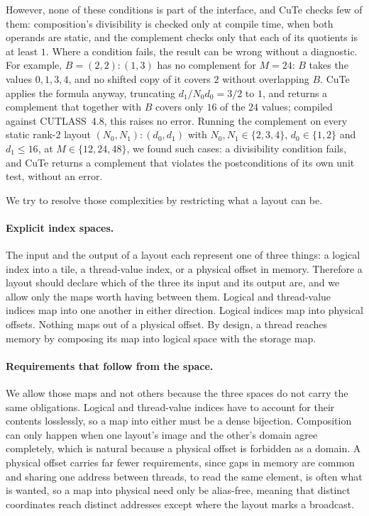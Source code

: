 However, none of these conditions is part of the interface, and CuTe checks
few of them: composition's divisibility is checked only at compile time, when
both operands are static, and the complement checks only that each of its
quotients is at least $1$. Where a condition fails, the result can be wrong
without a diagnostic. For example, $B = (2,2){:}(1,3)$ has no complement for
$M = 24$: $B$ takes the values $0,1,3,4$, and no shifted copy of it covers $2$
without overlapping $B$. CuTe applies the formula anyway, truncating
$d_1/N_0d_0 = 3/2$ to $1$, and returns a complement that together with $B$
covers only $16$ of the $24$ values; compiled against CUTLASS~4.8, this raises
no error. Running the complement on every static rank-2 layout
$(N_0,N_1){:}(d_0,d_1)$ with $N_0, N_1 \in \{2,3,4\}$, $d_0 \in \{1,2\}$ and
$d_1 \le 16$, at $M \in \{12,24,48\}$, we found \cuteCompViolatedBroken{} such
cases: a divisibility condition fails, and CuTe returns a complement that
violates the postconditions of its own unit test, without an error.

We try to resolve those complexities by restricting what a layout can be.

\paragraph{Explicit index spaces.} The input and the output of a layout each
represent one of three things: a logical index into a tile, a thread-value
index, or a physical offset in memory. Therefore a layout should declare which of the three its
input and its output are, and we allow only the maps worth having between them.
Logical and thread-value indices map into one another in either direction.
Logical indices map into physical offsets. Nothing maps out of a physical
offset. By design, a thread reaches memory by composing its map into logical
space with the storage map.

\paragraph{Requirements that follow from the space.} We allow those maps and
not others because the three spaces do not carry the same obligations. Logical
and thread-value indices have to account for their contents losslessly, so a
map into either must be a dense bijection. Composition can only happen when one
layout's image and the other's domain agree completely, which is natural
because a physical offset is forbidden as a domain. A physical offset carries
far fewer requirements, since gaps in memory are common and sharing one address
between threads, to read the same element, is often what is wanted, so a map
into physical need only be alias-free, meaning that distinct coordinates reach
distinct addresses except where the layout marks a broadcast.

